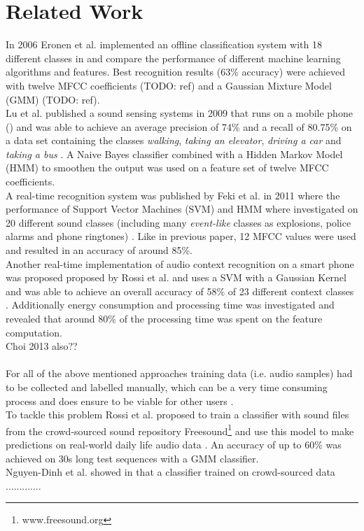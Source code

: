 \chapter{Related Work}\label{cha2}
In 2006 Eronen et al. implemented an offline classification system with 18 different classes in \cite{Eronen2006} and compare the performance of different machine learning algorithms and features. Best recognition results (63\% accuracy) were achieved with twelve MFCC coefficients (TODO: ref) and a Gaussian Mixture Model (GMM) (TODO: ref).\\
Lu et al. published a sound sensing systems in 2009 that runs on a mobile phone () and was able to achieve an average precision of 74\% and a recall of 80.75\% on a data set containing the classes \textit{walking}, \textit{taking an elevator}, \textit{driving a car} and \textit{taking a bus} \cite{Lu2009}. A Naive Bayes classifier combined with a Hidden Markov Model (HMM) to smoothen the output was used on a feature set of twelve MFCC coefficients.\\
A real-time recognition system was published by Feki et al. in 2011 where the performance of Support Vector Machines (SVM) and HMM where investigated on 20 different sound classes (including many \textit{event-like} classes as explosions, police alarms and phone ringtones) \cite{Feki2011}. Like in previous paper, 12 MFCC values were used and resulted in an accuracy of around 85\%.\\
Another real-time implementation of audio context recognition on a smart phone was proposed proposed by Rossi et al. and uses a SVM with a Gaussian Kernel and was able to achieve an overall accuracy of 58\% of 23 different context classes \cite{Rossi2013}. Additionally energy consumption and processing time was investigated and revealed that around 80\% of the processing time was spent on the feature computation.\\
Choi 2013 also?? \\
\\
For all of the above mentioned approaches training data (i.e. audio samples) had to be collected and labelled manually, which can be a very time consuming process and does ensure to be viable for other users \cite{Rossi2012}.\\
To tackle this problem Rossi et al. proposed to train a classifier with sound files from the crowd-sourced sound repository Freesound\footnote{www.freesound.org} and use this model to make predictions on real-world daily life audio data \cite{Rossi2012}. An accuracy of up to 60\% was achieved on 30s long test sequences with a GMM classifier.\\
Nguyen-Dinh et al. showed in \cite{Nguyen-Dinh2013} that a classifier trained on crowd-sourced data .............





